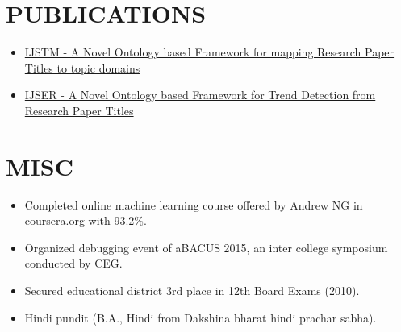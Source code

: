 \documentclass[11pt,a4paper]{article}
\begin{document}
\section* {PUBLICATIONS}
\begin{itemize}[noitemsep]
\item \href{http://www.ijstm.com/images/short_pdf/1427308779_1228.pdf}{IJSTM - A Novel Ontology based Framework for mapping Research Paper Titles to topic domains}
\item \href{https://www.ijser.org/researchpaper/A-Novel-Ontology-based-Framework-for-Trend-Detection-from-Research-Paper-Titles.pdf}{IJSER - A Novel Ontology based Framework for Trend Detection from Research Paper Titles}
\end{itemize}
\section*{MISC}

\begin{itemize}[noitemsep]
\item Completed online machine learning course offered by Andrew NG in coursera.org with 93.2\%.
\item Organized debugging event of aBACUS 2015, an inter college symposium conducted by CEG.
\item Secured educational district 3rd place in 12th Board Exams (2010).
\item Hindi pundit (B.A., Hindi from Dakshina bharat hindi prachar sabha).
\end{itemize}
\end{document}

